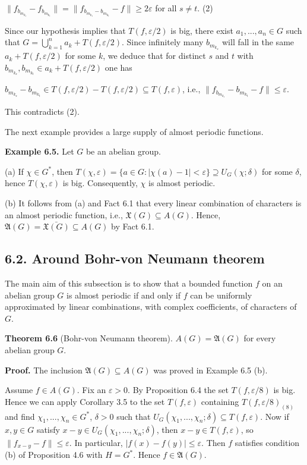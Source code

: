 \documentclass[12pt]{article}
\begin{document}
    $\| f_{b_{m_{k_s}}} - f_{b_{m_{k_t}}} \| = \| f_{b_{m_{k_s}}-b_{m_{k_t}}} - f \| \geq 2\varepsilon$ for all $s \neq t$. (2)


Since our hypothesis implies that $T(f , \varepsilon/2)$ is big, there exist $a_1,...,a_n \in G$ such that $G = \bigcup^n_{k=1} a_k + T(f , \varepsilon/2)$. Since
infinitely many $b_{m_{k_{s}}}$ will fall in the same $a_k + T (f , \varepsilon/2)$ for some $k$, we deduce that for distinct $s$ and $t$ with $b_{m_{k_{s}}} , b_{m_{k_{t}}} \in a_k + T (f , \varepsilon/2)$
one has


    $b_{m_{k_{s}}} - b_{m_{k_{t}}} \in T (f , \varepsilon/2) - T (f , \varepsilon/2) \subseteq T (f , \varepsilon)$, i.e., $\| f_{b_{m_{k_s}}}-b_{m_{k_{t}}} - f \| \leq \varepsilon$.


This contradicts (2).


    The next example provides a large supply of almost periodic functions.


\textbf{Example 6.5.} Let $G$ be an abelian group.


(a) If $\chi \in G^*$, then $T (\chi, \varepsilon) = \{ a \in G: |\chi(a)-1| < \varepsilon \} \supseteq U_G(\chi; \delta)$ for some $\delta$, hence $T (\chi, \varepsilon)$ is big. Consequently, $\chi$ is almost
periodic.


(b) It follows from (a) and Fact 6.1 that every linear combination of characters is an almost periodic function, i.e.,
$\mathfrak{X}(G) \subseteq A(G)$. Hence, $\mathfrak{A}(G) = \bar{\mathfrak{X}(G)} \subseteq A(G)$ by Fact 6.1.

\subsection{6.2. Around Bohr-von Neumann theorem}


    The main aim of this subsection is to show that a bounded function $f$ on an abelian group $G$ is almost periodic if and
only if $f$ can be uniformly approximated by linear combinations, with complex coefficients, of characters of $G$.


\textbf{Theorem 6.6} (Bohr-von Neumann theorem). $A(G) = \mathfrak{A}(G)$ for every abelian group $G$.


\textbf{Proof.} The inclusion $\mathfrak{A}(G) \subseteq A(G)$ was proved in Example 6.5 (b).
    

    Assume $f \in A(G)$. Fix an $\varepsilon > 0$. By Proposition 6.4 the set $T (f , \varepsilon /8)$ is big. Hence we can apply Corollary 3.5 to the
set $T (f , \varepsilon)$ containing $T (f , \varepsilon/8)_{(8)}$ and find $\chi_1,...,\chi_n \in G^*$, $\delta > 0$ such that $U_G (\chi_1,...,\chi_n; \delta) \subseteq T (f , \varepsilon)$. Now if $x, y \in G$
satisfy $x - y \in U_G (\chi_1,...,\chi_n; \delta)$, then $x - y \in T (f , \varepsilon)$, so $\| f_{x-y} - f \| \leqslant \varepsilon$. In particular, $| f (x) - f (y)| \leqslant \varepsilon$. Then $f$ satisfies
condition (b) of Proposition 4.6 with $H = G^*$. Hence $f \in \mathfrak{A}(G)$. 
\end{document}
